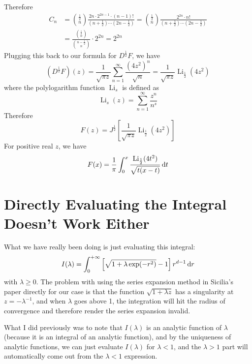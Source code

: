 \documentclass{report}
\DeclareMathOperator{\Li}{Li}
\begin{document}
Therefore
\begin{equation}
  \begin{split}
    C_n &= \binom{\frac{1}{2}}{n}\frac{2n\cdot 2^{2n-1} \cdot(n-1)!}{\left(n+\frac{1}{2}\right)\cdots\left(2n-\frac{1}{2}\right)} = \binom{\frac{1}{2}}{n}\frac{2^{2n}\cdot n!}{\left(n+\frac{1}{2}\right)\cdots\left(2n-\frac{1}{2}\right)}\\
    &=\frac{\binom{\frac{1}{2}}{n}}{\binom{n-\frac{1}{2}}{n}}\cdot2^{2n} = 2^{2n}
  \end{split}
\end{equation}
Plugging this back to our formula for $D^\frac{1}{2}F$, we have
\begin{equation}
  (D^\frac{1}{2}F)(z) = \frac{1}{\sqrt{\pi z}} \sum^\infty_{n=1} \frac{(4z^2)^n}{\sqrt{n}} = \frac{1}{\sqrt{\pi z}}\Li_{\frac{1}{2}}(4z^2)
\end{equation}
where the polylogarithm function $\Li_s$ is defined as
\begin{equation}
  \Li_s(z) = \sum^\infty_{n=1}\frac{z^n}{n^s}
\end{equation}
Therefore
\begin{equation}
  F(z) = J^\frac{1}{2}\left[\frac{1}{\sqrt{\pi z}}\Li_{\frac{1}{2}}(4z^2)\right]
\end{equation}
For positive real $z$, we have
\begin{equation}
  F(x) = \frac{1}{\pi}\int^x_0\frac{\Li_{\frac{1}{2}}(4t^2)}{\sqrt{t(x-t)}}\,{\rm d}t
\end{equation}

\section{Directly Evaluating the Integral Doesn't Work Either}
What we have really been doing is just evaluating this integral:
\begin{equation}
  I(\lambda) = \int^{+\infty}_0 \left[\sqrt{1+\lambda\exp(-r^2)} -1\right]r^{d-1}\,{\rm d}r
\end{equation}
with $\lambda \ge 0$. The problem with using the series expansion method in Sicilia's paper directly for our case is that the function $\sqrt{1+\lambda z}$ has a singularity at $z=-\lambda^{-1}$, and when $\lambda$ goes above 1, the integration will hit the radius of convergence and therefore render the series expansion invalid.

What I did previously was to note that $I(\lambda)$ is an analytic function of $\lambda$ (because it is an integral of an analytic function), and by the uniqueness of analytic functions, we can just evaluate $I(\lambda)$ for $\lambda < 1$, and the $\lambda > 1$ part will automatically come out from the $\lambda < 1$ expression.
\end{document}
